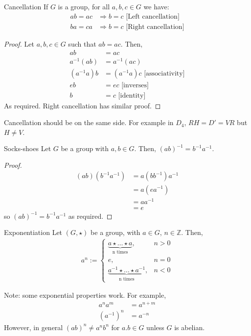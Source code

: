 \documentclass[12pt]{article}
\newcommand{\Z}{\mathbb{Z}}
\newcommand{\inv}{^{-1}}
\begin{document}
	\begin{myprop}{Cancellation}{}
		If $G$ is a group, for all $a, b, c\in G$ we have:
		\begin{align*}
			ab=ac&\Longrightarrow b=c\text{ [Left cancellation]}\\
			ba=ca&\Longrightarrow b=c\text{ [Right cancellation]}
		\end{align*}
		\begin{proof}
			Let $a, b, c\in G$ such that $ab=ac$. Then,
			\begin{align*}
				ab&=ac\\
				a\inv(ab)&=a\inv(ac)\\
				(a\inv a)b&=(a\inv a)c\text{ [associativity]}\\
				eb&=ec\text{ [inverses]}\\
				b&=c\text{ [identity]}
			\end{align*}
			As required. Right cancellation has similar proof.
		\end{proof}
	\end{myprop}
	
	\begin{myrem}{}{}
		Cancellation should be on the same side. For example in $D_4$, $RH=D'=VR$ but $H\neq V$.	
	\end{myrem}
	
	\begin{myprop}{Socks-shoes}{}
		Let $G$ be a group with $a, b\in G$. Then, $(ab)\inv=b\inv a\inv$.
		\begin{proof}
			\begin{align*}
				(ab)(b\inv a\inv)&=a(bb\inv)a\inv\\
				&=a(ea\inv)\\
				&=aa\inv\\
				&=e
			\end{align*}
			so $(ab)\inv=b\inv a\inv$ as required.
		\end{proof}			
	\end{myprop}
	
	\begin{mydef}{Exponentiation}{}
		Let $(G, \star)$ be a group, with $a\in G$, $n\in\Z$. Then,
		\begin{align*}
			a^n:=\begin{cases}
				\underbrace{a\star\dots\star a}_{\text{n times}},&n>0\\
				e,&n=0\\
				\underbrace{a\inv\star\dots\star a\inv}_{\text{n times}},&n<0
			\end{cases}
		\end{align*}
		
		Note: some exponential properties work. For example,
		\begin{align*}
			a^na^m&=a^{n+m}\\
			(a\inv)^n&=a^{-n}
		\end{align*}
		However, in general $(ab)^n\neq a^nb^n$ for $a. b\in G$ unless $G$ is abelian.
	\end{mydef}
	
\end{document}
